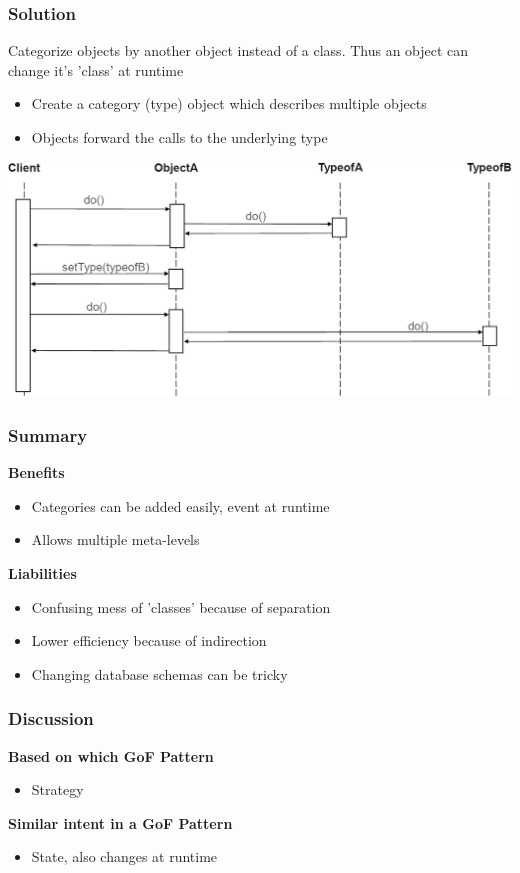 \subsubsection{Solution}
Categorize objects by another object instead of a class. Thus an object can change it's 'class' at runtime
\begin{itemize}
    \item Create a category (type) object which describes multiple objects
    \item Objects forward the calls to the underlying type
\end{itemize}
\includegraphics[width=\linewidth]{./img/type_object.png}
\subsubsection{Summary}
\textbf{Benefits}
\begin{itemize}
    \item Categories can be added easily, event at runtime
    \item Allows multiple meta-levels
\end{itemize}
\textbf{Liabilities}
\begin{itemize}
    \item Confusing mess of 'classes' because of separation
    \item Lower efficiency because of indirection
    \item Changing database schemas can be tricky
\end{itemize}
\subsubsection{Discussion}
\textbf{Based on which GoF Pattern}
\begin{itemize}
    \item Strategy
\end{itemize}
\textbf{Similar intent in a GoF Pattern}
\begin{itemize}
    \item State, also changes at runtime
\end{itemize}

